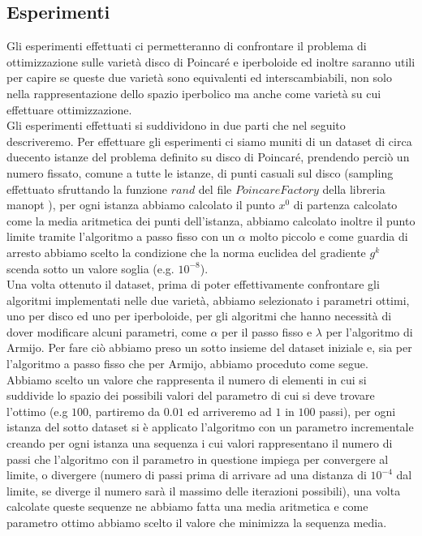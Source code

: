 \documentclass[a4paper, 12pt]{article}
\begin{document}
\subsection{Esperimenti}
Gli esperimenti effettuati ci permetteranno di confrontare il problema di ottimizzazione sulle varietà disco di Poincaré e iperboloide ed inoltre saranno utili per capire se queste due varietà sono equivalenti ed interscambiabili, non solo nella rappresentazione dello spazio iperbolico ma anche come varietà su cui effettuare ottimizzazione.\\
Gli esperimenti effettuati si suddividono in due parti che nel seguito descriveremo. Per effettuare gli esperimenti ci siamo muniti di un dataset di circa duecento istanze del problema definito su disco di Poincaré, prendendo perciò un numero fissato, comune a tutte le istanze, di punti casuali sul disco (sampling effettuato sfruttando la funzione $rand$ del file $PoincareFactory$ della libreria manopt \cite{ManOpt}), per ogni istanza abbiamo calcolato il punto $x^0$ di partenza calcolato come la media aritmetica dei punti dell'istanza, abbiamo calcolato inoltre il punto limite tramite l'algoritmo a passo fisso con un $\alpha$ molto piccolo e come guardia di arresto abbiamo scelto la condizione che la norma euclidea del gradiente $g^k$ scenda sotto un valore soglia (e.g. $10^{-8}$).\\
Una volta ottenuto il dataset, prima di poter effettivamente confrontare gli algoritmi implementati nelle due varietà, abbiamo selezionato i parametri ottimi, uno per disco ed uno per iperboloide, per gli algoritmi che hanno necessità di dover modificare alcuni parametri, come $\alpha$ per il passo fisso e $\lambda$ per l'algoritmo di Armijo. Per fare ciò abbiamo preso un sotto insieme del dataset iniziale e, sia per l'algoritmo a passo fisso che per Armijo, abbiamo proceduto come segue. Abbiamo scelto un valore che rappresenta il numero di elementi in cui si suddivide lo spazio dei possibili valori del parametro di cui si deve trovare  l'ottimo (e.g $100$, partiremo da $0.01$ ed arriveremo ad $1$ in $100$ passi), per ogni istanza del sotto dataset si è applicato l'algoritmo con un parametro incrementale creando per ogni istanza una sequenza i cui valori rappresentano il numero di passi che l'algoritmo con il parametro in questione impiega per convergere al limite, o divergere (numero di passi prima di arrivare ad una distanza di $10^{-4}$ dal limite, se diverge il numero sarà il massimo delle iterazioni possibili), una volta calcolate queste sequenze ne abbiamo fatta una media aritmetica e come parametro ottimo abbiamo scelto il valore che minimizza la sequenza media.\\
\end{document}
